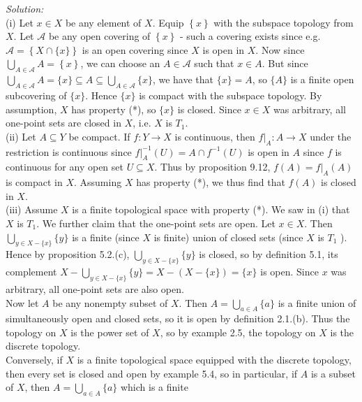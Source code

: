 \documentclass[a4paper]{article}
\begin{document}
\textit{Solution:}\\
(i) Let $x \in X$ be any element of $X$. Equip $\left\{ x \right\} $ with the
subspace topology from $X$. Let $\mathcal{A}$ be any open covering of $\left\{
x \right\} $ - such a covering exists since e.g. $\mathcal{A} = \left\{ X \cap
\{x\} \right\} $ is an open covering since $X$ is open in $X$.
Now since $\bigcup_{A \in \mathcal{A}} A = \left\{ x \right\} $, we can choose
an $A \in \mathcal{A}$ such that $x \in A$. But since
$\bigcup_{A \in \mathcal{A}} A = \{x\} \subseteq A \subseteq \bigcup_{A \in
\mathcal{A}} \{x\}$, we have that $\{x\} = A$, so $\{A\}$ is a finite open
subcovering of $\{x\}$. Hence $\{x\}$ is compact with the subspace topology. By
assumption, $X$ has property (*), so $\{x\}$ is closed. Since $x \in X$ was
arbitrary, all one-point sets are closed in $X$, i.e. $X$ is $T_1$.\\
\linebreak
(ii) Let $A \subseteq Y$ be compact. If $f  \colon Y \to X$ is continuous, then
$f|_{A}  \colon A \to X$ under the restriction is continuous since
$f|_{A}^{-1} (U) = A \cap f^{-1}(U)$ is open in $A$ since $f$ is continuous for any open set $U
\subseteq X$. Thus by proposition 9.12, $f(A) = f|_{A}(A)$ is compact in $X$.
Assuming $X$ has property (*), we thus find that $f(A)$ is closed in $X$.\\
\linebreak
(iii) Assume $X$ is a finite topological space with property (*). We saw in (i)
that $X$ is $T_1$. We further claim that the one-point sets are open.
Let $x \in X$. Then $\bigcup_{y \in X -\{x\}} \{y\}$ is a finite (since $X$ is
finite) union of closed sets (since $X$ is $T_1$ ). Hence by proposition
5.2.(c), $\bigcup_{y \in X -\{x\}} \{y\}$ is closed, so by definition 5.1, its
complement $X - \bigcup_{y \in X - \{x\}} \{y\} = X - \left( X - \{x\} \right)
= \{x\}$ is open. Since $x$ was arbitrary, all one-point sets are also open.\\
Now let $A$ be any nonempty subset of $X$. Then $A = \bigcup_{a \in A} \{a\}$ 
is a finite union of simultaneously open and closed sets, so it is open by
definition 2.1.(b). Thus the topology on $X$ is the power set of $X$, so by
example 2.5, the topology on $X$ is the discrete topology.\\
\linebreak
Conversely, if $X$ is a finite topological space equipped with the discrete
topology, then every set is closed and open by example 5.4, so in particular,
if $A$ is a subset of $X$, then $A = \bigcup_{a \in A} \{a\}$ which is a finite
\end{document}
